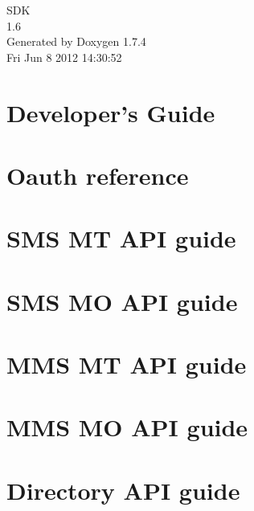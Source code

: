 \documentclass[a4paper]{book}
\begin{document}
\hypersetup{pageanchor=false}
\begin{titlepage}
\vspace*{7cm}
\begin{center}
{\Large SDK \\[1ex]\large 1.6 }\\
\vspace*{1cm}
{\large Generated by Doxygen 1.7.4}\\
\vspace*{0.5cm}
{\small Fri Jun 8 2012 14:30:52}\\
\end{center}
\end{titlepage}
\clearemptydoublepage
{}
\tableofcontents
\clearemptydoublepage
{}
\hypersetup{pageanchor=true}
\chapter{Developer's Guide}
\label{index}\hypertarget{index}{}
\chapter{Oauth reference}
\label{blv_oauth_guide}
\hypertarget{blv_oauth_guide}{}

\chapter{SMS MT API guide}
\label{blv_sms_mt_guide}
\hypertarget{blv_sms_mt_guide}{}

\chapter{SMS MO API guide}
\label{blv_sms_mo_guide}
\hypertarget{blv_sms_mo_guide}{}

\chapter{MMS MT API guide}
\label{blv_mms_mt_guide}
\hypertarget{blv_mms_mt_guide}{}

\chapter{MMS MO API guide}
\label{blv_mms_mo_guide}
\hypertarget{blv_mms_mo_guide}{}

\chapter{Directory API guide}
\label{blv_directory_guide}
\hypertarget{blv_directory_guide}{}

\end{document}
